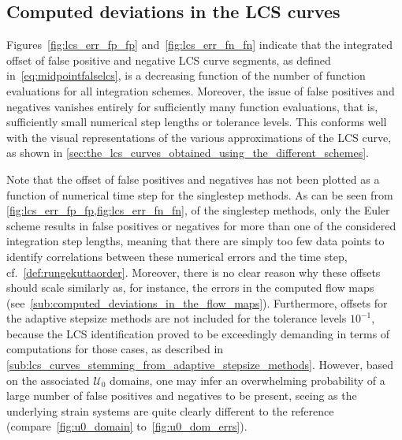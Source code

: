 \subsection{Computed deviations in the LCS curves}
\label{sub:computed_deviations_in_the_lcs_curves}

Figures~\ref{fig:lcs_err_fp_fp} and~\ref{fig:lcs_err_fn_fn} indicate that
the integrated offset of false positive and negative LCS curve segments, as
defined in~\cref{eq:midpointfalselcs}, is a decreasing function of the number of
function evaluations for all integration schemes. Moreover, the issue of false
positives and negatives vanishes entirely for sufficiently many function
evaluations, that is, sufficiently small numerical step lengths or tolerance
levels. This conforms well with the visual representations of the various
approximations of the LCS curve, as shown in
\cref{sec:the_lcs_curves_obtained_using_the_different_schemes}.

Note that the offset of false positives and negatives has not been plotted as a
function of numerical time step for the singlestep methods. As can be seen from
\cref{fig:lcs_err_fp_fp,fig:lcs_err_fn_fn}, of the singlestep methods, only the
Euler scheme results in false positives or negatives for more than one of the
considered integration step lengths, meaning that there are simply too few data
points to identify correlations between these numerical errors and the time
step, cf.\
\cref{def:rungekuttaorder}. Moreover, there is no clear reason why these offsets
should scale similarly as, for instance, the errors in the computed flow maps
(see~\cref{sub:computed_deviations_in_the_flow_maps}).
Furthermore, offsets for the adaptive stepsize methods are not included for the
tolerance levels $10^{-1}$, because the LCS identification proved to be
exceedingly demanding in terms of computations for those cases, as described in
\cref{sub:lcs_curves_stemming_from_adaptive_stepsize_methods}. However,
based on the associated $\mathcal{U}_{0}$ domains, one may infer an overwhelming
probability of a large number of false positives and negatives to be present,
seeing as the underlying strain systems are quite clearly different to the
reference (compare~\cref{fig:u0_domain} to~\cref{fig:u0_dom_errs}).




\clearpage


